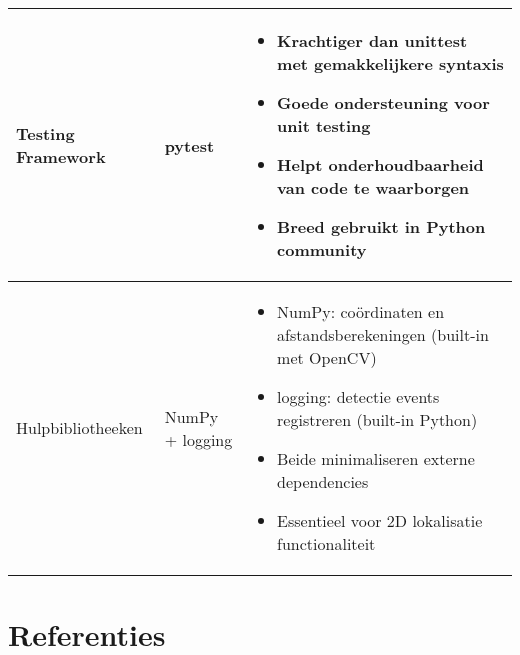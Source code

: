 \documentclass[11pt,a4paper]{scrartcl}
\begin{document}
\begin{longtable}{l >{\raggedright\arraybackslash}p{} >{\raggedright\arraybackslash}p{}}
Testing Framework & pytest & 
\vspace{-10pt}
\begin{itemize}[leftmargin=*,nosep,topsep=0pt]
\item Krachtiger dan unittest met gemakkelijkere syntaxis
\item Goede ondersteuning voor unit testing
\item Helpt onderhoudbaarheid van code te waarborgen
\item Breed gebruikt in Python community
\end{itemize}
\vspace{4pt} \\
\midrule

Hulpbibliotheeken & NumPy + logging & 
\vspace{-10pt}
\begin{itemize}[leftmargin=*,nosep,topsep=0pt]
\item NumPy: coördinaten en afstandsberekeningen (built-in met OpenCV)
\item logging: detectie events registreren (built-in Python)
\item Beide minimaliseren externe dependencies
\item Essentieel voor 2D lokalisatie functionaliteit
\end{itemize}
\vspace{4pt} \\
\bottomrule
\end{longtable}

\newpage
\section{Referenties}
\end{document}
